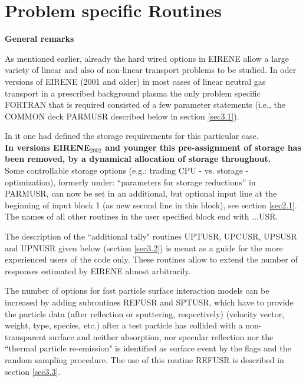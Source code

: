 \chapter{Problem specific Routines} \label{sec3}

\medskip

\noindent

{\bf General remarks}

\medskip

\noindent

As mentioned earlier, already the hard wired options in EIRENE allow
a large variety of linear and also of non-linear transport problems to be studied. In oder versions of EIRENE (2001 and older) in most
cases of linear neutral gas transport in a prescribed background plasma
the only problem specific FORTRAN that is required consisted of
a few parameter statements (i.e., the COMMON deck PARMUSR described
below in section \ref{sec3.1}).  

In it one had defined the
storage requirements for this particular case.
\\
{\bf In versions EIRENE$_{2002}$ and younger this pre-assignment
of storage has been removed, by a dynamical allocation of storage
throughout.}
\\
Some controllable storage options (e.g.: trading CPU - vs. storage -
optimization), formerly under: ``parameters for storage
reductions'' in PARMUSR, can now be set in an additional, but
optional input line at the beginning of input block 1 (as new
second line in this block), see section \ref{sec2.1}.
\\


The names of all other routines in the user specified block
end with ...USR.

\smallskip

\noindent

The description of the ``additional tally" routines UPTUSR, UPCUSR,
UPSUSR and UPNUSR given below (section \ref{sec3.2}) is meant as a
guide for the more experienced users of the code only. These
routines allow to extend the number of responses estimated by EIRENE
almost arbitrarily.

The number of options for fast particle surface interaction models
can be increased by adding subroutines REFUSR and SPTUSR,
which have to provide the particle data (after reflection or sputtering, respectively)
(velocity vector, weight, type, species, etc.) after
a test particle has collided with a non-transparent surface and neither
absorption, nor specular reflection nor the ``thermal particle re-emission"
is identified as
surface event by the flags and the random sampling procedure. The use of
this routine REFUSR is described in section \ref{sec3.3}.

